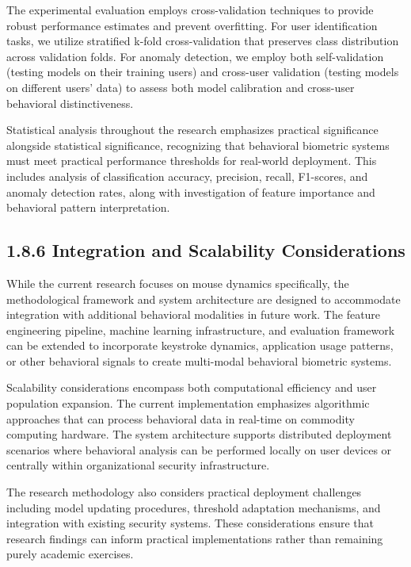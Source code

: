 \documentclass[
  12pt,
  a4paper,
]{report}
\begin{document}
The experimental evaluation employs cross-validation techniques to
provide robust performance estimates and prevent overfitting. For user
identification tasks, we utilize stratified k-fold cross-validation that
preserves class distribution across validation folds. For anomaly
detection, we employ both self-validation (testing models on their
training users) and cross-user validation (testing models on different
users' data) to assess both model calibration and cross-user behavioral
distinctiveness.

Statistical analysis throughout the research emphasizes practical
significance alongside statistical significance, recognizing that
behavioral biometric systems must meet practical performance thresholds
for real-world deployment. This includes analysis of classification
accuracy, precision, recall, F1-scores, and anomaly detection rates,
along with investigation of feature importance and behavioral pattern
interpretation.

\subsection{1.8.6 Integration and Scalability
Considerations}\label{integration-and-scalability-considerations}

While the current research focuses on mouse dynamics specifically, the
methodological framework and system architecture are designed to
accommodate integration with additional behavioral modalities in future
work. The feature engineering pipeline, machine learning infrastructure,
and evaluation framework can be extended to incorporate keystroke
dynamics, application usage patterns, or other behavioral signals to
create multi-modal behavioral biometric systems.

Scalability considerations encompass both computational efficiency and
user population expansion. The current implementation emphasizes
algorithmic approaches that can process behavioral data in real-time on
commodity computing hardware. The system architecture supports
distributed deployment scenarios where behavioral analysis can be
performed locally on user devices or centrally within organizational
security infrastructure.

The research methodology also considers practical deployment challenges
including model updating procedures, threshold adaptation mechanisms,
and integration with existing security systems. These considerations
ensure that research findings can inform practical implementations
rather than remaining purely academic exercises.
\end{document}
